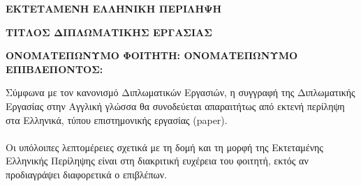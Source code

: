 \begin{center}  \Large{\textbf{ΕΚΤΕΤΑΜΕΝΗ ΕΛΛΗΝΙΚΗ ΠΕΡΙΛΗΨΗ}}  \end{center}
\begin{center}  \Large{\textbf{ΤΙΤΛΟΣ ΔΙΠΛΩΜΑΤΙΚΗΣ ΕΡΓΑΣΙΑΣ}}  \end{center}
\vspace{3pt}
\begin{center}  \large{\textbf{ΟΝΟΜΑΤΕΠΩΝΥΜΟ ΦΟΙΤΗΤΗ: \hspace{50pt} ΟΝΟΜΑΤΕΠΩΝΥΜΟ ΕΠΙΒΛΕΠΟΝΤΟΣ:}}  \end{center}
\vspace{10pt}
\noindent
Σύμφωνα με τον κανονισμό Διπλωματικών Εργασιών, η συγγραφή της Διπλωματικής Εργασίας στην Αγγλική γλώσσα θα συνοδεύεται απαραιτήτως από εκτενή περίληψη στα Ελληνικά, τύπου επιστημονικής εργασίας (paper).\\\\
\noindent
Οι υπόλοιπες λεπτομέρειες σχετικά με τη δομή και τη μορφή της Εκτεταμένης Ελληνικής Περίληψης είναι στη διακριτική ευχέρεια του φοιτητή, εκτός αν προδιαγράψει διαφορετικά ο επιβλέπων.\\
